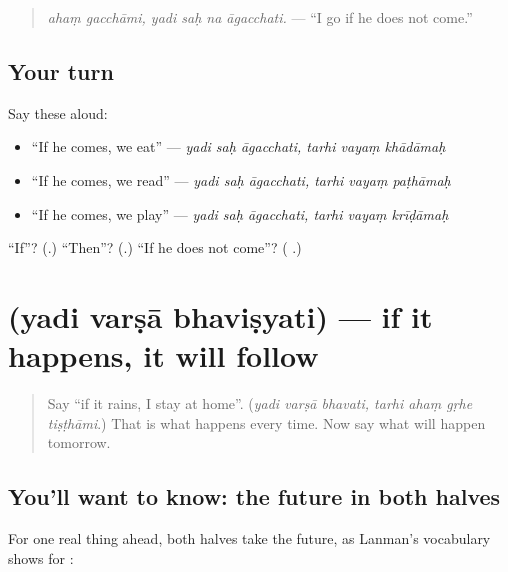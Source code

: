 \begin{quote}
\emph{ahaṃ gacchāmi, yadi saḥ na āgacchati.} — \textquotedblleft{}I go if he does not come.\textquotedblright{}
\end{quote}

\subsection*{Your turn}
Say these aloud:

\begin{itemize}
\raggedright
  \item \textquotedblleft{}If he comes, we eat\textquotedblright{} — \emph{yadi saḥ āgacchati, tarhi vayaṃ khādāmaḥ}
  \item \textquotedblleft{}If he comes, we read\textquotedblright{} — \emph{yadi saḥ āgacchati, tarhi vayaṃ paṭhāmaḥ}
  \item \textquotedblleft{}If he comes, we play\textquotedblright{} — \emph{yadi saḥ āgacchati, tarhi vayaṃ krīḍāmaḥ}
\end{itemize}

\begin{tcolorbox}[breakable,colback=teal!4,colframe=teal!35!black,title={Before you move on}]
\textquotedblleft{}If\textquotedblright{}? (\textbf{}.) \textquotedblleft{}Then\textquotedblright{}? (\textbf{}.) \textquotedblleft{}If he does not come\textquotedblright{}? (\textbf{   }.)
\end{tcolorbox}
\section[\texorpdfstring{\sk{यदि} \sk{वर्षा} \sk{भविष्यति} (yadi varṣā bhaviṣyati)}{यदि वर्षा भविष्यति (yadi varṣā bhaviṣyati)}]{   (yadi varṣā bhaviṣyati) — if it happens, it will follow}

\label{lesson:SA-C284-yadi-varsa-bhavisyati}



\begin{quote}
Say \textquotedblleft{}if it rains, I stay at home\textquotedblright{}. (\emph{yadi varṣā bhavati, tarhi ahaṃ gṛhe tiṣṭhāmi}.) That is what happens every time. Now say what will happen tomorrow.
\end{quote}

\subsection*{You'll want to know: the future in both halves}
For one real thing ahead, both halves take the future, as Lanman's vocabulary shows for \textbf{}:


